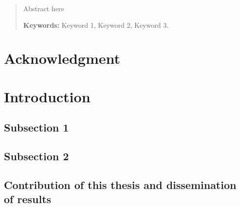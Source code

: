 \documentclass[12pt]{article} %
\theoremstyle{plain}
\begin{document}
	
	
	
	\begin{abstract}
		Abstract here
		
		{\bf Keywords:} Keyword 1, Keyword 2, Keyword 3.
	\end{abstract}
	\newpage
	
	\section*{Acknowledgment}
	
	\newpage
	
	\setcounter{tocdepth}{4} %
	\tableofcontents  %
	
	\newpage %
	
	\listoftables
	
	\newpage
	
	\listoffigures
	
	\newpage
	
	
	
	\section{Introduction}
	
	\subsection{Subsection 1}
	
	\subsection{Subsection 2}
	
	\subsection{Contribution of this thesis and dissemination of results}
	
\end{document}
